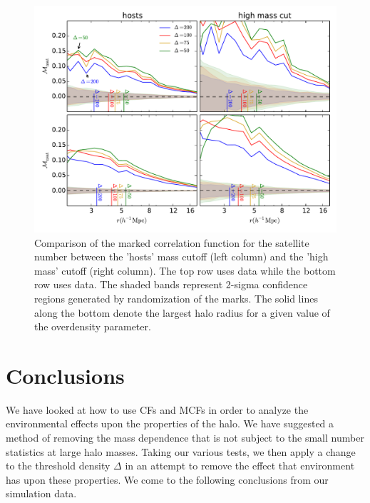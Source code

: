 \documentclass[usenatbib,usegraphicx,letterpaper]{mn2e}
\begin{document}
\begin{figure}
	\centering
	\includegraphics[width=\textwidth]{all_mcf_nsat_z00_hostsvhigh.pdf}
	\caption{Comparison of the marked correlation function for the satellite number between the 'hosts' mass cutoff (left column) and the 'high mass' cutoff (right column). The top row uses \simA data while the bottom row uses \simB data. The shaded bands represent 2-sigma confidence regions generated by randomization of the marks. The solid lines along the bottom denote the largest halo radius for a given value of the overdensity parameter.}
	\label{fig:hvh_mcf_nsat}
\end{figure}

\section[]{Conclusions}
\label{section:conclusions}

We have looked at how to use CFs and MCFs in order to analyze the environmental effects upon the properties of the halo. We have suggested a method of removing the mass dependence that is not subject to the small number statistics at large halo masses. Taking our various tests, we then apply a change to the threshold density $\Delta$ in an attempt to remove the effect that environment has upon these properties. We come to the following conclusions from our simulation data.
\end{document}
